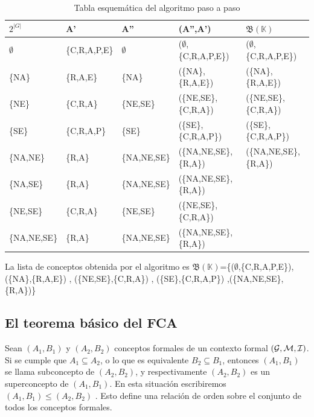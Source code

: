 \documentclass[oneside,openright,titlepage,numbers=noenddot,openany,headinclude,footinclude=true,
cleardoublepage=empty,abstractoff,BCOR=5mm,paper=a4,fontsize=12pt,main=spanish]{scrreprt}
\begin{document}
\begin{exampleth}
\begin{table}[H]
\begin{tabular}{lllll}
\hline
$2^{|G|}$    & A'            & A''          & (A'',A')                    & $\mathfrak{B}(\mathbb{K})$ \\ \hline
$\emptyset$  & \{C,R,A,P,E\} & $\emptyset$  & ($\emptyset$,\{C,R,A,P,E\}) & ($\emptyset$,\{C,R,A,P,E\}) \\
\{NA\}       & \{R,A,E\}     & \{NA\}       & (\{NA\},\{R,A,E\})          & (\{NA\},\{R,A,E\})          \\
\{NE\}       & \{C,R,A\}     & \{NE,SE\}    & (\{NE,SE\},\{C,R,A\})       & (\{NE,SE\},\{C,R,A\})       \\
\{SE\}       & \{C,R,A,P\}   & \{SE\}       & (\{SE\},\{C,R,A,P\})        & (\{SE\},\{C,R,A,P\})        \\
\{NA,NE\}    & \{R,A\}       & \{NA,NE,SE\} & (\{NA,NE,SE\},\{R,A\})      & (\{NA,NE,SE\},\{R,A\})      \\
\{NA,SE\}    & \{R,A\}       & \{NA,NE,SE\} & (\{NA,NE,SE\},\{R,A\})      &                             \\
\{NE,SE\}    & \{C,R,A\}     & \{NE,SE\}    & (\{NE,SE\},\{C,R,A\})       &                             \\
\{NA,NE,SE\} & \{R,A\}       & \{NA,NE,SE\} & (\{NA,NE,SE\},\{R,A\})      &                            
\end{tabular}
\caption{Tabla esquemática del algoritmo paso a paso}
\label{tab:naive-algorithm}
\end{table}


La lista de conceptos obtenida por el algoritmo es $\mathfrak{B}(\mathbb{K})$=\{($\emptyset$,\{C,R,A,P,E\}),(\{NA\},\{R,A,E\}) , (\{NE,SE\},\{C,R,A\}) , (\{SE\},\{C,R,A,P\}) ,(\{NA,NE,SE\},\{R,A\})\}
\end{exampleth}
\subsection{El teorema básico del FCA}

Sean $(A_{1},B_{1})$ y $(A_{2},B_{2})$ conceptos formales de un contexto formal $(\mathcal{G},\mathcal{M},\mathcal{I})$. Si se cumple que $A_{1} \subseteq A_{2}$, o lo que es equivalente $B_{2} \subseteq B_{1}$, entonces $(A_{1},B_{1})$ se llama subconcepto de $(A_{2},B_{2})$, y respectivamente $(A_{2},B_{2})$ es un superconcepto de $(A_{1},B_{1})$. En esta situación escribiremos $(A_{1},B_{1}) \leq (A_{2},B_{2})$ . Esto define una relación de orden sobre el conjunto de todos los conceptos formales. 
\end{document}
